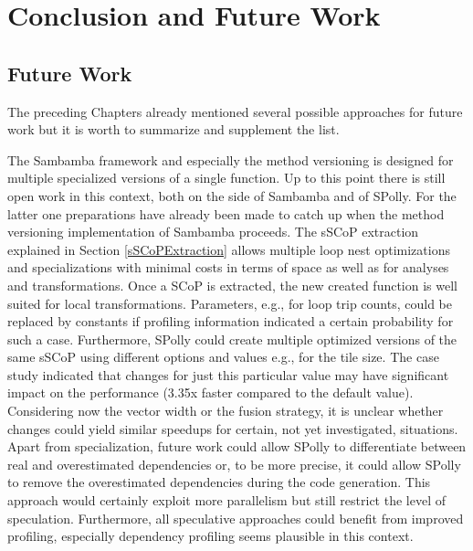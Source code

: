 
\chapter{Conclusion and Future Work} %
\label{Chapter7}



\section{Future Work}
The preceding Chapters already mentioned several possible approaches for future work 
but it is worth to summarize and supplement the list. 

The Sambamba framework and especially the method versioning is designed for 
multiple specialized versions of a single function.
Up to this point there is still open work in this context,
both on the side of Sambamba and of SPolly. For the latter one 
preparations have already been made to catch up when the method versioning 
implementation of Sambamba proceeds. 
The sSCoP extraction explained in Section \ref{sSCoPExtraction} allows multiple
loop nest optimizations and specializations with minimal costs in terms of space
as well as for analyses and transformations. Once a SCoP is extracted, the 
new created function is well suited for local transformations.
Parameters,  e.g., for loop trip counts, could be replaced by constants if
profiling information indicated a certain probability for such a case.
Furthermore, SPolly could create multiple optimized versions of the same sSCoP
using  different options and values e.g., for the tile size.
The case study indicated  that changes for just this particular value may have
significant impact on the performance (3.35x faster compared to the default value).
Considering now the vector width or the fusion strategy, it is unclear whether 
changes could yield similar speedups for certain, not yet investigated, situations. 
Apart from specialization, future work could allow SPolly to differentiate between
real and overestimated dependencies or, to be more precise, it could allow SPolly 
to remove the overestimated dependencies during the code generation. This 
approach would certainly exploit more parallelism but still restrict
the level of speculation. Furthermore, all speculative approaches could benefit 
from improved profiling, especially dependency profiling seems plausible in this context. 



